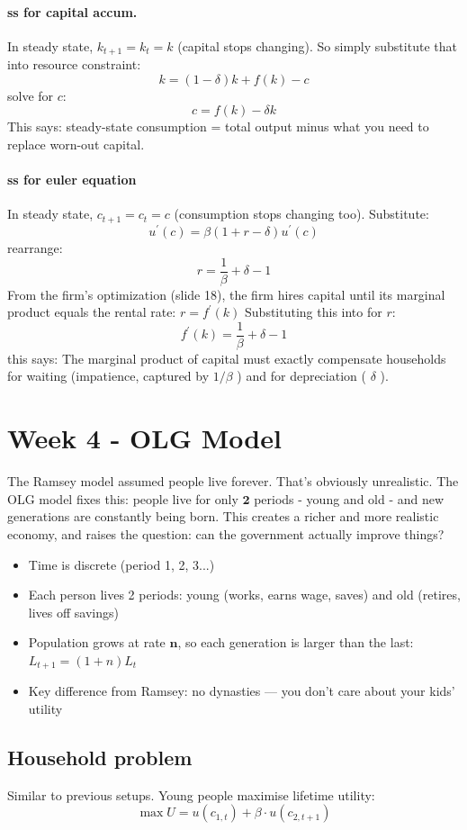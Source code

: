 \documentclass[12pt]{article}
\begin{document}
\paragraph{ss for capital accum.}In steady state, $k_{t+1}=k_t=k$ (capital stops changing). So simply substitute that into resource constraint:
$$
k=(1-\delta) k+f(k)-c
$$
solve for $c$:
$$
c=f(k)-\delta k
$$
This says: steady-state consumption = total output minus what you need to replace worn-out capital.
\paragraph{ss for euler equation}
In steady state, $c_{t+1}=c_t=c$ (consumption stops changing too). Substitute:
$$
u^{\prime}(c)=\beta(1+r-\delta) u^{\prime}(c)
$$
rearrange:
$$
r=\frac{1}{\beta}+\delta-1
$$
From the firm's optimization (slide 18), the firm hires capital until its marginal product equals the rental rate: $r=f^{\prime}(k)$
Substituting this into for $r$:
$$
f^{\prime}(k)=\frac{1}{\beta}+\delta-1
$$
this says: The marginal product of capital must exactly compensate households for waiting (impatience, captured by $1 / \beta$ ) and for depreciation ( $\delta$ ).

\section{Week 4 - OLG Model}
The Ramsey model assumed people live forever. That's obviously unrealistic. The OLG model fixes this: people live for only $\mathbf{2}$ periods - young and old - and new generations are constantly being born. This creates a richer and more realistic economy, and raises the question: can the government actually improve things?
\begin{itemize}
    \item Time is discrete (period 1, 2, 3...)
    \item Each person lives 2 periods: young (works, earns wage, saves) and old (retires, lives off savings)
    \item Population grows at rate $\mathbf{n}$, so each generation is larger than the last: $L_{t+1}=(1+n) L_t$
    \item Key difference from Ramsey: no dynasties — you don't care about your kids' utility
\end{itemize}

\subsection{Household problem}
Similar to previous setups. Young people maximise lifetime utility:
$$
\max U=u\left(c_{1, t}\right)+\beta \cdot u\left(c_{2, t+1}\right)
$$
\end{document}
